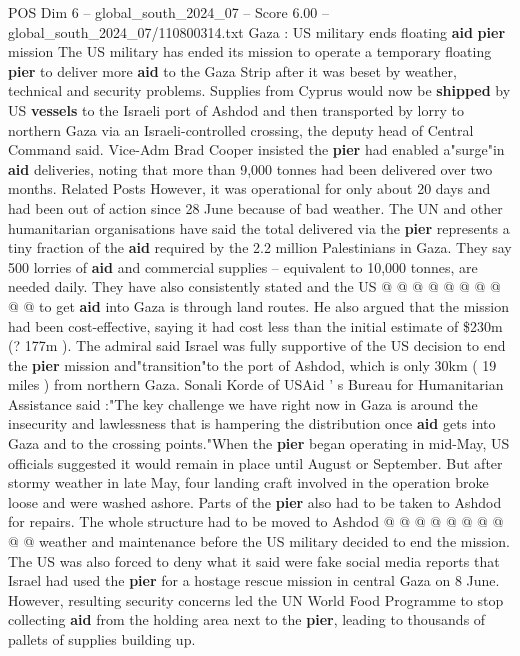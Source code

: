 \begin{textsample}{POS Dim 6 – global\_south\_2024\_07 – Score 6.00 – global\_south\_2024\_07/110800314.txt}  \label{ex:f6_pos_313}
Gaza : US military ends floating \textbf{aid} \textbf{pier} mission The US military has ended its mission to operate a temporary floating \textbf{pier} to deliver more \textbf{aid} to the Gaza Strip after it was beset by weather, technical and security problems.
Supplies from Cyprus would now be \textbf{shipped} by US \textbf{vessels} to the Israeli port of Ashdod and then transported by lorry to northern Gaza via an Israeli-controlled crossing, the deputy head of Central Command said.
Vice-Adm Brad Cooper insisted the \textbf{pier} had enabled a"surge"in \textbf{aid} deliveries, noting that more than 9,000 tonnes had been delivered over two months.
Related Posts However, it was operational for only about 20 days and had been out of action since 28 June because of bad weather.
The UN and other humanitarian organisations have said the total delivered via the \textbf{pier} represents a tiny fraction of the \textbf{aid} required by the 2.2 million Palestinians in Gaza.
They say 500 lorries of \textbf{aid} and commercial supplies -- equivalent to 10,000 tonnes, are needed daily.
They have also consistently stated and the US @ @ @ @ @ @ @ @ @ @ to get \textbf{aid} into Gaza is through land routes.
He also argued that the mission had been cost-effective, saying it had cost less than the initial estimate of \$230m (? 177m ).
The admiral said Israel was fully supportive of the US decision to end the \textbf{pier} mission and"transition"to the port of Ashdod, which is only 30km ( 19 miles ) from northern Gaza.
Sonali Korde of USAid ' s Bureau for Humanitarian Assistance said :"The key challenge we have right now in Gaza is around the insecurity and lawlessness that is hampering the distribution once \textbf{aid} gets into Gaza and to the crossing points."When the \textbf{pier} began operating in mid-May, US officials suggested it would remain in place until August or September.
But after stormy weather in late May, four landing craft involved in the operation broke loose and were washed ashore.
Parts of the \textbf{pier} also had to be taken to Ashdod for repairs.
The whole structure had to be moved to Ashdod @ @ @ @ @ @ @ @ @ @ weather and maintenance before the US military decided to end the mission.
The US was also forced to deny what it said were fake social media reports that Israel had used the \textbf{pier} for a hostage rescue mission in central Gaza on 8 June.
However, resulting security concerns led the UN World Food Programme to stop collecting \textbf{aid} from the holding area next to the \textbf{pier}, leading to thousands of pallets of supplies building up.

\end{textsample}
